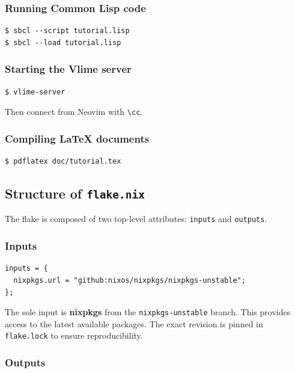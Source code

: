 \documentclass[a4paper,11pt]{article}
\newcommand{\key}[1]{\texttt{#1}}
\newcommand{\file}[1]{\texttt{#1}}
\begin{document}
\subsubsection{Running Common Lisp code}

\begin{lstlisting}[style=shell]
$ sbcl --script tutorial.lisp
$ sbcl --load tutorial.lisp
\end{lstlisting}

\subsubsection{Starting the Vlime server}

\begin{lstlisting}[style=shell]
$ vlime-server
\end{lstlisting}

Then connect from Neovim with \key{\textbackslash cc}.

\subsubsection{Compiling \LaTeX{} documents}

\begin{lstlisting}[style=shell]
$ pdflatex doc/tutorial.tex
\end{lstlisting}

\subsection{Structure of \file{flake.nix}}

The flake is composed of two top-level attributes: \texttt{inputs} and \texttt{outputs}.

\subsubsection{Inputs}

\begin{lstlisting}[style=nix]
inputs = {
  nixpkgs.url = "github:nixos/nixpkgs/nixpkgs-unstable";
};
\end{lstlisting}

The sole input is \textbf{nixpkgs} from the \texttt{nixpkgs-unstable} branch.
This provides access to the latest available packages.
The exact revision is pinned in \file{flake.lock} to ensure reproducibility.

\subsubsection{Outputs}
\end{document}
